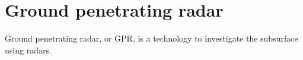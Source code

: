 \section{Ground penetrating radar}

Ground penetrating radar, or GPR, is a technology to investigate the subsurface using radars.